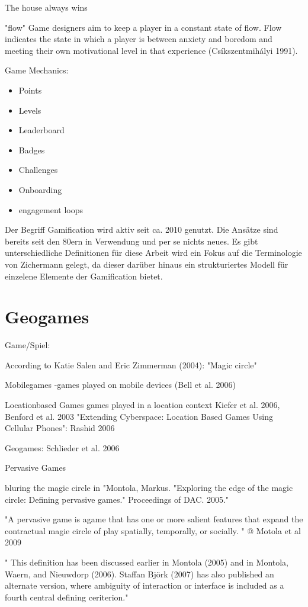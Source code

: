 The house always wins

"flow"
Game designers aim to
keep a player in a constant state of flow. Flow indicates the state in which a player is between
anxiety and boredom and meeting their own motivational level in that experience
(Csíkszentmihályi 1991).

Game Mechanics:
\begin{itemize}
      \item Points
      \item Levels
      \item Leaderboard
      \item Badges
      \item Challenges
      \item Onboarding
      \item engagement loops
\end{itemize}

Der Begriff Gamification wird aktiv seit ca. 2010 genutzt. Die Ansätze sind bereits seit den 80ern in Verwendung und per se nichts neues.
Es gibt unterschiedliche Definitionen für diese Arbeit wird ein Fokus auf die Terminologie von Zichermann gelegt, da dieser darüber hinaus ein strukturiertes Modell für einzelene Elemente der Gamification bietet.

\section{Geogames}
\label{subsec:S3_Geogames}

Game/Spiel:

According to  Katie  Salen  and  Eric  Zimmerman  (2004): "Magic circle"

Mobilegames
-games played on mobile devices (Bell et al. 2006)

Locationbased Games
games played in a location context
Kiefer et al. 2006, Benford et al. 2003
"Extending Cyberspace: Location Based Games Using Cellular Phones":
Rashid 2006

Geogames:
Schlieder et al. 2006

Pervasive Games

bluring the magic circle in "Montola, Markus. "Exploring the edge of the magic circle: Defining pervasive games." Proceedings of DAC. 2005."

"A pervasive game is agame that has one or more salient features that expand the 
contractual magie circle of play spatially, temporally, or socially. " @ Motola et al 2009

" This   definition   has   been   discussed   earlier  in   Montola   (2005)   and   in   Montola,   Waern,   and 
Nieuwdorp  (2006).  Staffan  Björk  (2007)  has  also  published  an  alternate version,  where  ambiguity 
of  interaction or  interface is  included  as  a  fourth  central  defining ceriterion." 

